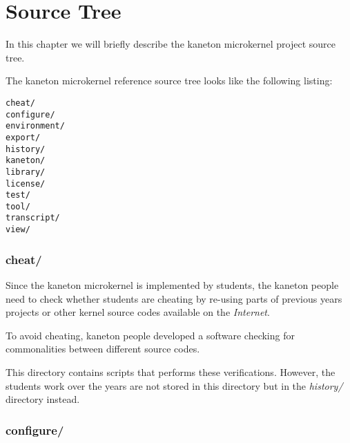 %
%
%
%
%
%

%
%

\chapter{Source Tree}
\label{chapter:source tree}

In this chapter we will briefly describe the kaneton microkernel project
source tree.

\newpage

%
%

The kaneton microkernel reference source tree looks like the following
listing:

\begin{verbatim}
cheat/
configure/
environment/
export/
history/
kaneton/
library/
license/
test/
tool/
transcript/
view/
\end{verbatim}

%
%

\subsection*{cheat/}

Since the kaneton microkernel is implemented by students, the kaneton
people need to check whether students are cheating by re-using parts of
previous years projects or other kernel source codes available on the
\textit{Internet}.

To avoid cheating, kaneton people developed a software checking for
commonalities between different source codes.

This directory contains scripts that performs these verifications. However,
the students work over the years are not stored in this directory but in
the \textit{history/} directory instead.

%
%

\subsection*{configure/}

